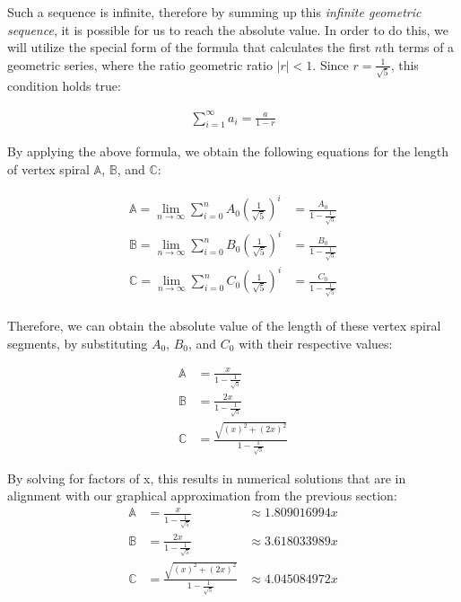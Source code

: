 Such a sequence is infinite, therefore by summing up this \emph{infinite geometric sequence}, it is possible for us to reach the absolute value. In order to do this, we will utilize the special form of the formula that calculates the first $n$th terms of a geometric series, where the ratio geometric ratio $|r| < 1$. Since $r = \frac{1}{\sqrt{5}}$, this condition holds true:

\begin{equation}
    \begin{aligned}
        \sum_{i=1}^{\infty}a_i=\frac{a}{1-r}
    \end{aligned}
\end{equation}

\noindent
By applying the above formula, we obtain the following equations for the length of vertex spiral $\mathbb{A}$, $\mathbb{B}$, and $\mathbb{C}$:

\begin{equation}
    \begin{aligned}
        \mathbb{A} = \lim_{n \to \infty} \sum_{i=0}^{n} A_0\left(\frac{1}{\sqrt{5}}\right)^i &=\frac{A_0}{1-\frac{1}{\sqrt{5}}} \\
        \mathbb{B} = \lim_{n \to \infty} \sum_{i=0}^{n} B_0\left(\frac{1}{\sqrt{5}}\right)^i &=\frac{B_0}{1-\frac{1}{\sqrt{5}}} \\
        \mathbb{C} = \lim_{n \to \infty} \sum_{i=0}^{n} C_0\left(\frac{1}{\sqrt{5}}\right)^i &=\frac{C_0}{1-\frac{1}{\sqrt{5}}} \\
    \end{aligned}
\end{equation}

\noindent
Therefore, we can obtain the absolute value of the length of these vertex spiral segments, by substituting $A_0$, $B_0$, and $C_0$ with their respective values:

\begin{equation}
    \begin{aligned}
        \mathbb{A} &=\frac{x}{1-\frac{1}{\sqrt{5}}} \\
        \mathbb{B} &=\frac{2x}{1-\frac{1}{\sqrt{5}}} \\
        \mathbb{C} &=\frac{\sqrt{(x)^2 + (2x)^2}}{1-\frac{1}{\sqrt{5}}}
    \end{aligned}
\end{equation}

\noindent
By solving for factors of x, this results in numerical solutions that are in alignment with our graphical approximation from the previous section:
\begin{equation}
    \begin{aligned}
        \mathbb{A} &=\frac{x}{1-\frac{1}{\sqrt{5}}} &\approx 1.809016994x\\
        \mathbb{B} &=\frac{2x}{1-\frac{1}{\sqrt{5}}} &\approx 3.618033989x\\
        \mathbb{C} &=\frac{\sqrt{(x)^2 + (2x)^2}}{1-\frac{1}{\sqrt{5}}} &\approx 4.045084972x
    \end{aligned}
\end{equation}

